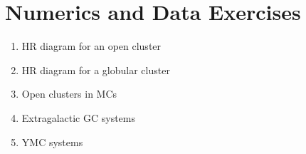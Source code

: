 \section{Numerics and Data Exercises}

\begin{enumerate}
\item HR diagram for an open cluster
\item HR diagram for a globular cluster 
\item Open clusters in MCs
\item Extragalactic GC systems
\item YMC systems
\end{enumerate}


  
